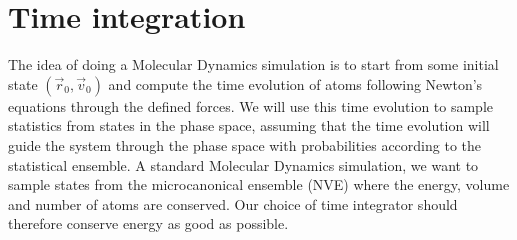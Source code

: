 \section{Time integration}
The idea of doing a Molecular Dynamics simulation is to start from some initial state $(\vec r_0, \vec v_0)$ and compute the time evolution of atoms following Newton's equations through the defined forces. We will use this time evolution to sample statistics from states in the phase space, assuming that the time evolution will guide the system through the phase space with probabilities according to the statistical ensemble. A standard Molecular Dynamics simulation, we want to sample states from the microcanonical ensemble (NVE) where the energy, volume and number of atoms are conserved. Our choice of time integrator should therefore conserve energy as good as possible.\\
